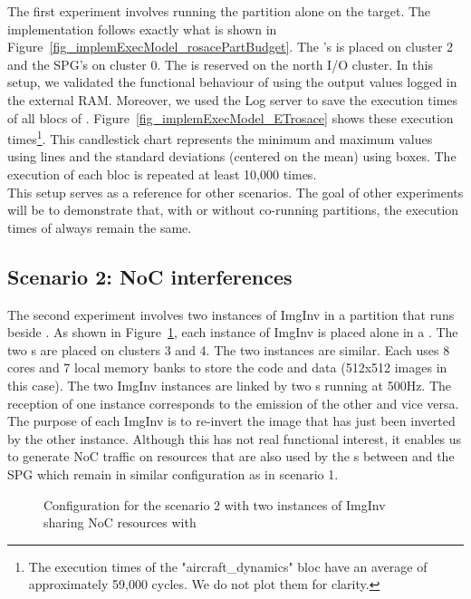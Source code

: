 \documentclass[main.tex]{subfiles}
\begin{document}
The first experiment involves running the \rosace partition alone on the target. The implementation follows exactly what is shown in Figure~\ref{fig_implemExecModel_rosacePartBudget}. The \rosace's \PN{} is placed on cluster 2 and the SPG's \PN{} on cluster 0. The \ION{} is reserved on the north I/O cluster. In this setup, we validated the functional behaviour of \rosace using the output values logged in the external RAM. Moreover, we used the Log server to save the execution times of all blocs of \rosace. Figure~\ref{fig_implemExecModel_ETrosace} shows these execution times\footnote{The execution times of the "aircraft\_dynamics" bloc have an average of approximately 59,000 cycles. We do not plot them for clarity.}. This candlestick chart represents the minimum and maximum values using lines and the standard deviations (centered on the mean) using boxes. The execution of each bloc is repeated at least 10,000 times.\\

This setup serves as a reference for other scenarios. The goal of other experiments will be to demonstrate that, with or without co-running partitions, the execution times of \rosace always remain the same.




\subsection{Scenario 2: NoC interferences}
The second experiment involves two instances of ImgInv in a partition that runs beside \rosace. As shown in Figure~\ref{fig_implemExecModel_scenario2budget}, each instance of ImgInv is placed alone in a \PN{}. The two \PN{}s are placed on clusters 3 and 4. The two instances are similar. Each uses 8 cores and 7 local memory banks to store the code and data (512x512 images in this case). The two ImgInv instances are linked by two \PC{}s running at 500Hz. The reception \PC{} of one instance corresponds to the emission \PC{} of the other and vice versa. The purpose of each ImgInv is to re-invert the image that has just been inverted by the other instance. Although this has not real functional interest, it enables us to generate NoC traffic on resources that are also used by the \PC{}s between \rosace and the SPG which remain in similar configuration as in scenario 1. 

\begin{figure}
    \centering
    \scalebox{0.7}{}
    \caption{Configuration for the scenario 2 with two instances of ImgInv sharing NoC resources with \rosace}
    \label{fig_implemExecModel_scenario2budget}
\end{figure}
\end{document}
